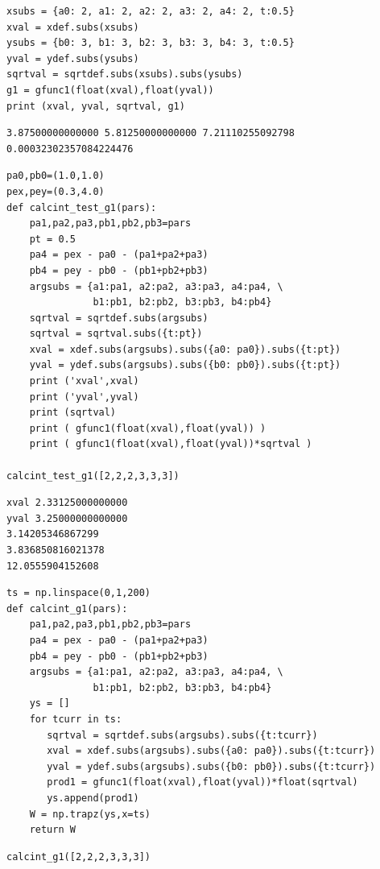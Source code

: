 \documentclass[12pt,fleqn]{article}\usepackage{../../common}
\begin{document}
\begin{verbatim}
xsubs = {a0: 2, a1: 2, a2: 2, a3: 2, a4: 2, t:0.5}
xval = xdef.subs(xsubs)
ysubs = {b0: 3, b1: 3, b2: 3, b3: 3, b4: 3, t:0.5}
yval = ydef.subs(ysubs)
sqrtval = sqrtdef.subs(xsubs).subs(ysubs)
g1 = gfunc1(float(xval),float(yval))
print (xval, yval, sqrtval, g1)
\end{verbatim}

\begin{verbatim}
3.87500000000000 5.81250000000000 7.21110255092798 0.00032302357084224476
\end{verbatim}

\begin{verbatim}
pa0,pb0=(1.0,1.0)
pex,pey=(0.3,4.0)
def calcint_test_g1(pars):
    pa1,pa2,pa3,pb1,pb2,pb3=pars
    pt = 0.5
    pa4 = pex - pa0 - (pa1+pa2+pa3)
    pb4 = pey - pb0 - (pb1+pb2+pb3)
    argsubs = {a1:pa1, a2:pa2, a3:pa3, a4:pa4, \
               b1:pb1, b2:pb2, b3:pb3, b4:pb4}
    sqrtval = sqrtdef.subs(argsubs)
    sqrtval = sqrtval.subs({t:pt})
    xval = xdef.subs(argsubs).subs({a0: pa0}).subs({t:pt})
    yval = ydef.subs(argsubs).subs({b0: pb0}).subs({t:pt})
    print ('xval',xval)
    print ('yval',yval)
    print (sqrtval)
    print ( gfunc1(float(xval),float(yval)) )
    print ( gfunc1(float(xval),float(yval))*sqrtval )
    
calcint_test_g1([2,2,2,3,3,3])
\end{verbatim}

\begin{verbatim}
xval 2.33125000000000
yval 3.25000000000000
3.14205346867299
3.836850816021378
12.0555904152608
\end{verbatim}

\begin{verbatim}
ts = np.linspace(0,1,200)
def calcint_g1(pars):
    pa1,pa2,pa3,pb1,pb2,pb3=pars
    pa4 = pex - pa0 - (pa1+pa2+pa3)
    pb4 = pey - pb0 - (pb1+pb2+pb3)
    argsubs = {a1:pa1, a2:pa2, a3:pa3, a4:pa4, \
               b1:pb1, b2:pb2, b3:pb3, b4:pb4}
    ys = []
    for tcurr in ts:
       sqrtval = sqrtdef.subs(argsubs).subs({t:tcurr})
       xval = xdef.subs(argsubs).subs({a0: pa0}).subs({t:tcurr})
       yval = ydef.subs(argsubs).subs({b0: pb0}).subs({t:tcurr})
       prod1 = gfunc1(float(xval),float(yval))*float(sqrtval)
       ys.append(prod1)
    W = np.trapz(ys,x=ts)
    return W    
\end{verbatim}

\begin{verbatim}
calcint_g1([2,2,2,3,3,3])
\end{verbatim}
\end{document}
